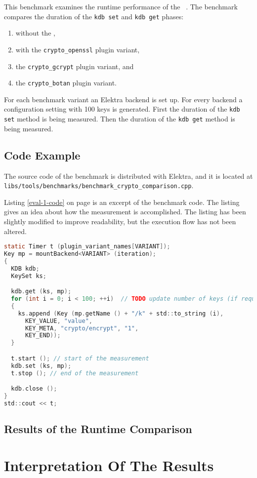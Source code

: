 This benchmark examines the runtime performance of the \crypto ~.
The benchmark compares the duration of the \texttt{kdb set} and \texttt{kdb get} phases:

\begin{enumerate}
\item without the \crypto ,
\item with the \texttt{crypto\_openssl} plugin variant,
\item the \texttt{crypto\_gcrypt} plugin variant, and 
\item the \texttt{crypto\_botan} plugin variant.
\end{enumerate}

For each benchmark variant an Elektra backend is set up.
For every backend a configuration setting with 100 keys  is generated.
First the duration of the \texttt{kdb set} method is being measured.
Then the duration of the \texttt{kdb get} method is being measured.

  \subsection{Code Example}

The source code of the benchmark is distributed with Elektra, and it is located at\\
\texttt{libs/tools/benchmarks/benchmark\_crypto\_comparison.cpp}.

Listing \ref{eval-1-code} on page \pageref{eval-1-code} is an excerpt of the benchmark code.
The listing gives an idea about how the measurement is accomplished.
The listing has been slightly modified to improve readability, but the execution flow has not been altered.

\begin{lstlisting}[label=eval-1-code,language=C,caption={Excerpt of Benchmark 1}]
static Timer t (plugin_variant_names[VARIANT]);
Key mp = mountBackend<VARIANT> (iteration);
{
  KDB kdb;
  KeySet ks;

  kdb.get (ks, mp);
  for (int i = 0; i < 100; ++i)  // TODO update number of keys (if required)!
  {
    ks.append (Key (mp.getName () + "/k" + std::to_string (i),
      KEY_VALUE, "value",
      KEY_META, "crypto/encrypt", "1",
      KEY_END));
  }

  t.start (); // start of the measurement
  kdb.set (ks, mp);
  t.stop (); // end of the measurement

  kdb.close ();
}
std::cout << t;
\end{lstlisting}

  \subsection{Results of the Runtime Comparison}




\section{Interpretation Of The Results}



